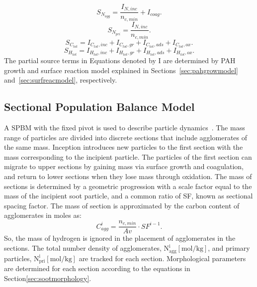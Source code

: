 \begin{equation}
	S_{N_{agg}} = \frac{I_{N,inc}}{n_{c,min}}+I_{coag}
	\label{eqn:S_N_agg}.
\end{equation}
\begin{equation}
	S_{N_{pri}} = \frac{I_{N,inc}}{n_{c,min}}
	\label{eqn:S_N_pri}.
\end{equation}
\begin{equation}
	S_{C_{tot}} = I_{C_{tot},inc}+I_{C_{tot},gr}+I_{C_{tot},ads}+I_{C_{tot},ox}
	\label{eqn:S_C_tot}.
\end{equation}
\begin{equation}
	S_{H_{tot}} = I_{H_{tot},inc}+I_{H_{tot},gr}+I_{H_{tot},ads}+I_{H_{tot},ox}
	\label{eqn:S_H_tot}.
\end{equation}
The partial source terms in Equations denoted by $\mathrm{I}$ are determined by PAH growth and surface reaction model explained in Sections~\ref{sec:pahgrowmodel} and~\ref{sec:surfreacmodel}, respectively.

\subsection{Sectional Population Balance Model}
A SPBM with the fixed pivot is used to describe particle dynamics~\citep{wu1988discrete}. The mass range of particles are divided into discrete sections that include agglomerates of the same mass. Inception introduces new particles to the first section with the mass corresponding to the incipient particle. The particles of the first section can migrate to upper sections by gaining mass via surface growth and coagulation, and return to lower sections when they lose mass through oxidation. The mass of sections is determined by a geometric progression with a scale factor equal to the mass of the incipient soot particle, and a common ratio of SF, known as sectional spacing factor. The mass of section is approximated by the carbon content of agglomerates in moles as:
\begin{equation}
	C^i_{agg} = \frac{n_{c,min}}{Av}\cdot SF^{i-1}
	\label{eqn:Caggsec}.
\end{equation}
So, the mass of hydrogen is ignored in the placement of agglomerates in the sections.
The total number density of agglomerates, $\mathrm{N^i_{agg} [mol/kg]}$, and primary particles, $\mathrm{N^i_{pri} [mol/kg]}$ are tracked for each section. Morphological parameters are determined for each section according to the equations in Section\ref{sec:sootmorphology}.

